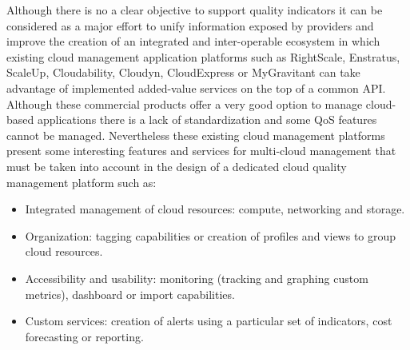 Although there is no a clear objective to support quality indicators it can be considered as a major effort to unify information exposed by providers and 
improve the creation of an integrated and inter-operable ecosystem in which existing cloud management application platforms such 
as RightScale, Enstratus, ScaleUp, Cloudability, Cloudyn, CloudExpress or MyGravitant can take advantage of implemented 
added-value services on the top of a common API. Although these commercial products offer a very good option 
to manage cloud-based applications there is a lack of standardization and some QoS features cannot be managed.  
Nevertheless these existing cloud management platforms present some interesting features and services for 
multi-cloud management that must be taken into account in the design of a dedicated cloud quality management platform such as:
\begin{itemize}
 \item Integrated management of cloud resources: compute, networking and storage.
 \item Organization: tagging capabilities or creation of profiles and views to group cloud resources.
 \item Accessibility and usability: monitoring (tracking and graphing custom metrics), dashboard or import capabilities.
 \item Custom services: creation of alerts using a particular set of indicators, cost forecasting or reporting.
\end{itemize}

